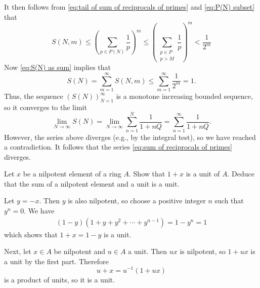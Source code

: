 \documentclass{homework}
\begin{document}
\begin{solution}
\begin{equation*}
\end{equation*}
It then follows from \eqref{eq:tail of sum of reciprocals of primes} and
\eqref{eq:P(N) subset} that
\begin{equation*}
S(N, m)
\leq \left(\sum_{p \in P(N)} \frac{1}{p}\right)^{m}
\leq \left(\sum_{\substack{p \in P \\ p > M}} \frac{1}{p}\right)^{m}
< \frac{1}{2^m}
\end{equation*}
Now \eqref{eq:S(N) as sum} implies that
\begin{equation*}
S(N)
= \sum_{m=1}^\infty S(N, m)
\leq \sum_{m=1}^\infty \frac{1}{2^m} = 1.
\end{equation*}
Thus, the sequence $(S(N))_{N=1}^\infty$ is a monotone increasing bounded
sequence, so it converges to the limit
\begin{equation*}
\lim_{N \to \infty} S(N)
= \lim_{N \to \infty} \sum_{n=1}^N \frac{1}{1 + n Q}
= \sum_{n=1}^\infty \frac{1}{1 + n Q}.
\end{equation*}
However, the series above diverges (e.g., by the integral test), so we have
reached a contradiction.
It follows that the series \eqref{eq:sum of reciprocals of primes} diverges.
\end{solution}

\begin{problem}
Let $x$ be a nilpotent element of a ring $A$.
Show that $1 + x$ is a unit of $A$.
Deduce that the sum of a nilpotent element and a unit is a unit.
\end{problem}

\begin{solution}
Let $y = -x$.
Then $y$ is also nilpotent, so choose a positive integer $n$ such that
$y^n = 0$.
We have
\begin{align*}
(1 - y) (1 + y + y^2 + \cdots + y^{n-1})
= 1 - y^n
= 1
\end{align*}
which shows that $1 + x = 1 - y$ is a unit.

Next, let $x\in A$ be nilpotent and $u\in A$ a unit.
Then $ux$ is nilpotent, so $1 + ux$ is a unit by the first part.
Therefore
\begin{equation*}
u + x = u^{-1}(1 + ux)
\end{equation*}
is a product of units, so it is a unit.
\end{solution}
\end{document}
